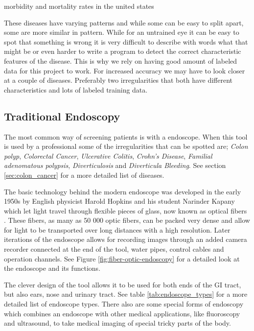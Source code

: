 \documentclass[thesis.tex]{subfiles}
\begin{document}
morbidity and mortality rates in the united states

These diseases have varying patterns and while some can be easy to split apart, some are more similar in pattern. While for an untrained eye it can be easy to spot that something is wrong it is very difficult to describe with words what that might be or even harder to write a program to detect the correct characteristic features of the disease. This is why we rely on having good amount of labeled data for this project to work. For increased accuracy we may have to look closer at a couple of diseases. Preferably two irregularities that both have different characteristics and lots of labeled training data.



\subsection{Traditional Endoscopy}

The most common way of screening patients is with a endoscope. When this tool is used by a professional some of the irregularities that can be spotted are; \textit{Colon polyp}, \textit{Colorectal Cancer}, \textit{Ulcerative Colitis}, \textit{Crohn's Disease}, \textit{Familial adenomatous polypsis}, \textit{Diverticulosis} and \textit{Diverticula Bleeding}. See section \ref{sec:colon_cancer} for a more detailed list of diseases.

The basic technology behind the modern endoscope was developed in the early 1950s by English physicist Harold Hopkins and his student Narinder Kapany which let light travel through flexible pieces of glass, now known as optical fibers \cite{NewMethod54}. These fibers, as many as 50 000 optic fibers, can be packed very dense and allow for light to be transported over long distances with a high resolution. Later iterations of the endoscope allows for recording images through an added camera recorder connected at the end of the tool, water pipes, control cables and operation channels. See Figure \ref{fig:fiber-optic-endoscopy} for a detailed look at the endoscope and its functions.

The clever design of the tool allows it to be used for both ends of the GI tract, but also ears, nose and urinary tract. See table \ref{tab:endoscope_types} for a more detailed list of endoscope types. There also are some special forms of endoscopy which combines an endoscope with other medical applications, like fluoroscopy and ultrasound, to take medical imaging of special tricky parts of the body.
\end{document}
